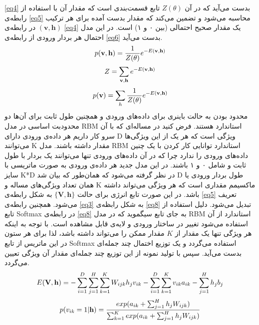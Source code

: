 \documentclass[12pt,a4paper]{article}
\begin{document}
\ref{eq4}
بدست می‌‌آید که در آن
$Z(\theta)$
تابع قسمت‌بندی است که مقدار آن با استفاده از رابطه‌ی 
\ref{eq5}
محاسبه می‌شود و تضمین می‌کند که مقدار بدست آمده برای هر ترکیب
$(\textbf{v},\textbf{h})$
در رابطه‌ی 
\ref{eq4}
یک مقدار صحیح احتمالی‌ (بین ۰ و ۱) است. در این مدل احتمال هر بردار ورودی از رابطه‌ی
\ref{eq6}
بدست می‌‌آید.
\begin{align}
\centering
\label{eq4}
p(\textbf{v},\textbf{h}) = \dfrac{1}{Z(\theta)} e^{-E(\textbf{v},\textbf{h})}
\end{align}
\begin{align}
\centering
\label{eq5}
Z = \sum_{\textbf{v}, \textbf{h}}e^{-E(\textbf{v},\textbf{h})}
\end{align}
\begin{align}
\centering
\label{eq6}
p(\textbf{v}) = \sum_{h} \dfrac{1}{Z(\theta)} e^{-E(\textbf{v},\textbf{h})}
\end{align}
محدود بودن به حالت باینری برای داده‌های ورودی و همچنین طول ثابت برای آن‌ها دو محدودبت اساسی در مدل RBM استاندارد هستند. فرض کنید در مساله‌ای‌ که با آن سرو کار داریم هر داده‌ی ورودی دارای D ویژگی‌ است که هر یک از این ویژگی‌ها می‌‌توانند K مقدار داشته باشند. مدل RBM استاندارد توانایی کار کردن با یک چنین داده‌های ورودی را ندارد چرا که در آن داده‌های ورودی تنها می‌‌توانند یک بردار با طول ثابت و شامل ۰ و ۱ باشند. در این مدل جدید هر داده‌ی ورودی به صورت ماتریسی با سایز K*D در نظر گرفته می‌شود که همان‌طور که بیان شد D طول بردار ورودی یا همان تعداد ویژگی‌های مساله و K ماکسیمم مقداری است که هر ویژگی‌ می‌‌تواند داشته باشد. در این صورت تابع انرژی برای حالت
$\{\textbf{V},\textbf{h}\}$
به شکل رابطه‌ی
\ref{eq5}
تعریف می‌‌شود. همچنین رابطه‌ی
\ref{eq3}
به شکل رابظه‌ی
\ref{eq8}
تبدیل می‌شود.  دلیل استفاده از تابع
Softmax
در رابطه‌ی
\ref{eq8}
به جای تابع سیگموید که در مدل
RBM
استاندارد از آن استفاده می‌‌شود تغییر در ساختار ورودی و لایه‌ی قابل مشاهده است. با توجه به اینکه هر ویژگی‌ تنها یک مقدار از
$K$
مقدار ممکن را می‌‌تواند داشته باشد، لذا برای هر ستون در این ماتریس از تابع
Softmax
استفاده می‌گردد و یک توزیع اختمال چند جمله‌ای بدست می‌آید. سپس با تولید نمونه از این توزیع چند جمله‌ای مقدار آن ویژگی‌ تعیین می‌‌گردد.
\begin{align}
\centering
\label{eq7}
E(\textbf{V},\textbf{h})=-\sum_{i=1}^{D}\sum_{j=1}^{H}\sum_{k=1}^{K}W_{ijk}h_jv_{ik}-\sum_{i=1}^{D}\sum_{k=1}^{K}v_{ik}a_{ik} - \sum_{j=1}^{H}h_jb_j
\end{align}
\begin{align}
\centering
\label{eq8}
p(v_{ik}=1|\textbf{h})=\dfrac{exp(a_{ik}+\sum_{j=1}^{H}h_jW_{ijk})}{\sum_{k=1}^{K}exp(a_{ik}+\sum_{j=1}^{H}h_jW_{ijk})}
\end{align}
\end{document}
